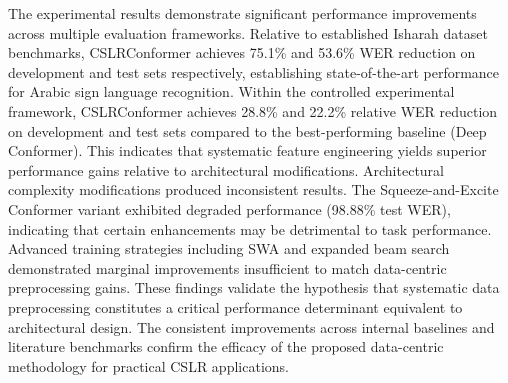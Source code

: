 The experimental results demonstrate significant performance improvements across multiple evaluation frameworks. Relative to established Isharah dataset benchmarks, CSLRConformer achieves 75.1\% and 53.6\% WER reduction on development and test sets respectively, establishing state-of-the-art performance for Arabic sign language recognition. Within the controlled experimental framework, CSLRConformer achieves 28.8\% and 22.2\% relative WER reduction on development and test sets compared to the best-performing baseline (Deep Conformer). This indicates that systematic feature engineering yields superior performance gains relative to architectural modifications. Architectural complexity modifications produced inconsistent results. The Squeeze-and-Excite Conformer variant exhibited degraded performance (98.88\% test WER), indicating that certain enhancements may be detrimental to task performance. Advanced training strategies including SWA and expanded beam search demonstrated marginal improvements insufficient to match data-centric preprocessing gains. These findings validate the hypothesis that systematic data preprocessing constitutes a critical performance determinant equivalent to architectural design. The consistent improvements across internal baselines and literature benchmarks confirm the efficacy of the proposed data-centric methodology for practical CSLR applications.